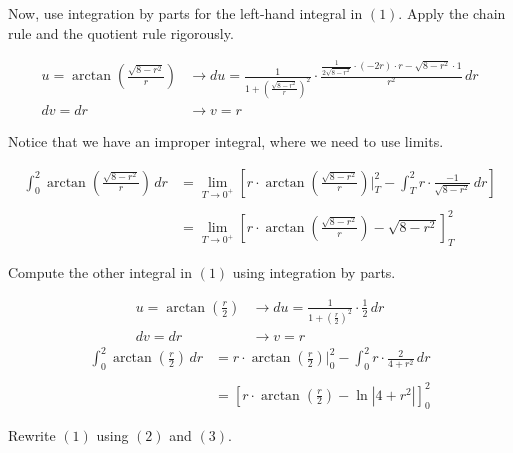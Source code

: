\documentclass{article}
\begin{document}
\hfill

\noindent Now, use integration by parts for the left-hand integral in $(1)$. Apply the chain rule and the quotient rule rigorously.

\begin{align*}
\displaystyle u=\arctan\left(\frac{\sqrt{8-r^2}}r\right)&\rightarrow\displaystyle du=\frac1{\displaystyle1+\left(\frac{\sqrt{8-r^2}}r\right)^2}\cdot\frac{\displaystyle \frac{1}{2\sqrt{8-r^2}}\cdot(-2r)\cdot r -\sqrt{8-r^2}\cdot 1}{r^2}\,dr\\
\displaystyle dv=dr&\rightarrow v=r
\end{align*}

\newpage

\noindent Notice that we have an improper integral, where we need to use limits.

\begin{align}
\int_0^2\arctan\left(\frac{\sqrt{8-r^2}}r\right)\,dr&=\lim_{T\to0^+}\left[r\cdot\arctan\left(\frac{\sqrt{8-r^2}}r\right)\Bigg|_T^2-\int_T^2r\cdot\frac{-1}{\sqrt{8-r^2}}\,dr\right]\nonumber\\\nonumber\\&=\lim_{T\to0^+}\left[r\cdot\arctan\left(\frac{\sqrt{8-r^2}}r\right)-\sqrt{8-r^2}\right]_T^2
\end{align}

\hfill

\noindent Compute the other integral in $(1)$ using integration by parts.

\begin{align*}
\displaystyle u=\arctan\left(\frac{r}2\right)&\rightarrow\displaystyle du=\frac1{\displaystyle1+\left(\frac{r}2\right)^2}\cdot\frac12\,dr\\
\displaystyle dv=dr&\rightarrow v=r
\end{align*}
\begin{align}
\int_0^2\arctan\left(\frac r2\right)\,dr&=r\cdot\arctan\left(\frac r2\right)\Bigg|_0^2-\int_0^2r\cdot\frac2{4+r^2}\,dr\nonumber\\\nonumber\\&=\left[r\cdot\arctan\left(\frac r 2\right)-\ln\left|4+r^2\right|\right]_0^2
\end{align}

\hfill

\noindent Rewrite $(1)$ using $(2)$ and $(3)$.
\end{document}
